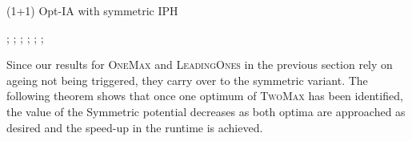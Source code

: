 \documentclass[lettersize,journal]{IEEEtran}
\begin{document}
\begin{algorithm}[t!] 
\caption{(1+1) Opt-IA with symmetric IPH}
\label{alg:symmetric}
\begin{algorithmic}[1] %
	;
	;
	;
	;
	\ENDIF
	\ELSE
	;
	\ENDIF
	; 
	\ENDIF
	\ENDFOR
	\ENDWHILE
\end{algorithmic}
\end{algorithm}
Since our results for \textsc{OneMax} and \textsc{LeadingOnes} in the previous section rely on ageing not being triggered, they carry over to the symmetric variant. 
The following theorem shows that once one optimum of \textsc{TwoMax} has been identified, the value of the Symmetric {\expoHD } potential decreases as both optima are approached as desired and the speed-up in the runtime is achieved.
\end{document}
